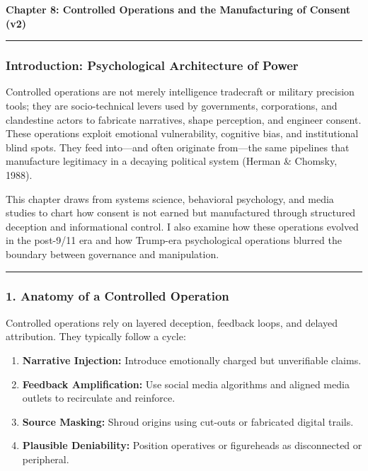 \textbf{Chapter 8: Controlled Operations and the Manufacturing of
Consent (v2)}

\begin{center}\rule{0.5\linewidth}{0.5pt}\end{center}

\subsubsection{Introduction: Psychological Architecture of
Power}\label{introduction-psychological-architecture-of-power}

Controlled operations are not merely intelligence tradecraft or military
precision tools; they are socio-technical levers used by governments,
corporations, and clandestine actors to fabricate narratives, shape
perception, and engineer consent. These operations exploit emotional
vulnerability, cognitive bias, and institutional blind spots. They feed
into---and often originate from---the same pipelines that manufacture
legitimacy in a decaying political system (Herman \& Chomsky, 1988).

This chapter draws from systems science, behavioral psychology, and
media studies to chart how consent is not earned but manufactured
through structured deception and informational control. I also examine
how these operations evolved in the post-9/11 era and how Trump-era
psychological operations blurred the boundary between governance and
manipulation.

\begin{center}\rule{0.5\linewidth}{0.5pt}\end{center}

\subsubsection{1. Anatomy of a Controlled
Operation}\label{anatomy-of-a-controlled-operation}

Controlled operations rely on layered deception, feedback loops, and
delayed attribution. They typically follow a cycle:

\begin{enumerate}
\def\labelenumi{\arabic{enumi}.}
\tightlist
\item
  \textbf{Narrative Injection:} Introduce emotionally charged but
  unverifiable claims.
\item
  \textbf{Feedback Amplification:} Use social media algorithms and
  aligned media outlets to recirculate and reinforce.
\item
  \textbf{Source Masking:} Shroud origins using cut-outs or fabricated
  digital trails.
\item
  \textbf{Plausible Deniability:} Position operatives or figureheads as
  disconnected or peripheral.
\end{enumerate}

